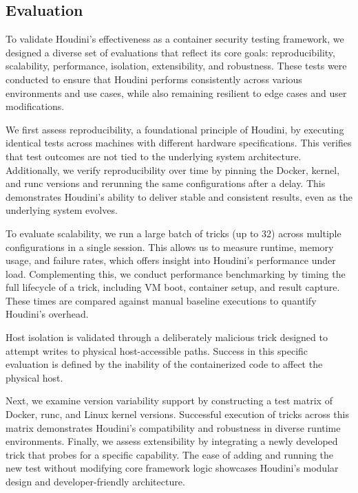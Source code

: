 \fontsize{12pt}{14pt} \selectfont
\begin{doublespace}
\chapter{Evaluation}

To validate Houdini’s effectiveness as a container security testing framework, we designed a diverse set of evaluations that reflect its core goals: reproducibility, scalability, performance, isolation, extensibility, and robustness. These tests were conducted to ensure that Houdini performs consistently across various environments and use cases, while also remaining resilient to edge cases and user modifications.

We first assess reproducibility, a foundational principle of Houdini, by executing identical tests across machines with different hardware specifications. This verifies that test outcomes are not tied to the underlying system architecture. Additionally, we verify reproducibility over time by pinning the Docker, kernel, and runc versions and rerunning the same configurations after a delay. This demonstrates Houdini’s ability to deliver stable and consistent results, even as the underlying system evolves.

To evaluate scalability, we run a large batch of tricks (up to 32) across multiple configurations in a single session. This allows us to measure runtime, memory usage, and failure rates, which offers insight into Houdini’s performance under load. Complementing this, we conduct performance benchmarking by timing the full lifecycle of a trick, including VM boot, container setup, and result capture. These times are compared against manual baseline executions to quantify Houdini’s overhead.

Host isolation is validated through a deliberately malicious trick designed to attempt writes to physical host-accessible paths. Success in this specific evaluation is defined by the inability of the containerized code to affect the physical host.

Next, we examine version variability support by constructing a test matrix of Docker, runc, and Linux kernel versions. Successful execution of tricks across this matrix demonstrates Houdini’s compatibility and robustness in diverse runtime environments. Finally, we assess extensibility by integrating a newly developed trick that probes for a specific capability. The ease of adding and running the new test without modifying core framework logic showcases Houdini’s modular design and developer-friendly architecture.


\end{doublespace}
